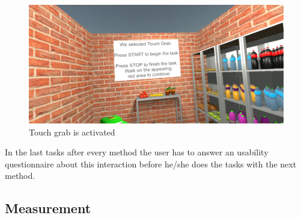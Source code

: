 \begin{figure}[H] 
	\center 
	\includegraphics[width=12cm]{Images/TaskWall_2.PNG}
	\caption[Touch grab is activated]{Touch grab is activated}
	\label{fig:taskW2}
\end{figure}

In the last tasks after every method the user has to answer an usability questionnaire about this interaction before he/she does the tasks with the next method. \\

\subsection{Measurement} \label{sec:measurement}



\newpage